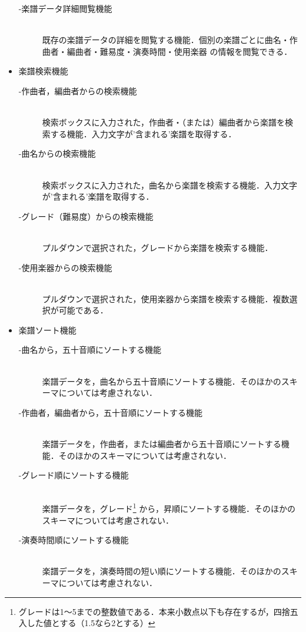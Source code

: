 \begin{itemize}
\begin{description}
        \item[-楽譜データ詳細閲覧機能] \mbox{}\\
            既存の楽譜データの詳細を閲覧する機能．個別の楽譜ごとに曲名・作曲者・編曲者・難易度・演奏時間・使用楽器
            の情報を閲覧できる．
    \end{description}
    \item 楽譜検索機能
    \begin{description}
        \item[-作曲者，編曲者からの検索機能]\mbox{}\\
            検索ボックスに入力された，作曲者・（または）編曲者から楽譜を検索する機能．入力文字が'含まれる'楽譜を取得する．
        \item[-曲名からの検索機能] \mbox{}\\
            検索ボックスに入力された，曲名から楽譜を検索する機能．入力文字が'含まれる'楽譜を取得する．
        \item[-グレード（難易度）からの検索機能] \mbox{}\\
            プルダウンで選択された，グレードから楽譜を検索する機能．
        \item[-使用楽器からの検索機能] \mbox{}\\
            プルダウンで選択された，使用楽器から楽譜を検索する機能．複数選択が可能である．
    \end{description}
    \item 楽譜ソート機能
    \begin{description}
        \item[-曲名から，五十音順にソートする機能]\mbox{}\\
            楽譜データを，曲名から五十音順にソートする機能．そのほかのスキーマについては考慮されない．
        \item[-作曲者，編曲者から，五十音順にソートする機能] \mbox{}\\
            楽譜データを，作曲者，または編曲者から五十音順にソートする機能．そのほかのスキーマについては考慮されない．
        \item[-グレード順にソートする機能] \mbox{}\\
            楽譜データを，グレード\footnote{グレードは1〜5までの整数値である．本来小数点以下も存在するが，四捨五入した値とする（1.5なら2とする）}
            から，昇順にソートする機能．そのほかのスキーマについては考慮されない．
        \item[-演奏時間順にソートする機能] \mbox{}\\
            楽譜データを，演奏時間の短い順にソートする機能．そのほかのスキーマについては考慮されない．

\end{description}
\end{itemize}
